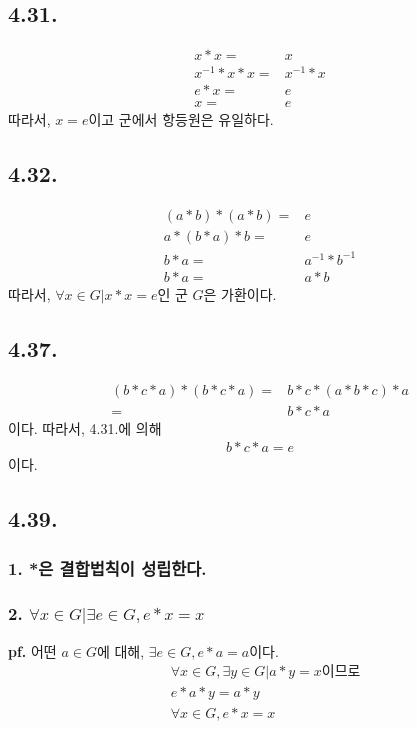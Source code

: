 \documentclass{article}
\begin{document}
\subsection{4.31.}
\begin{align*}
x * x =& x
\\ x^{-1} * x * x =& x^{-1} * x
\\ e * x =& e
\\ x =& e
\end{align*}
따라서, $x=e$이고 군에서 항등원은 유일하다.

\subsection{4.32.}
\begin{align*}
(a * b) * (a * b) =& e
\\ a * (b * a) * b =& e
\\ b * a =& a^{-1} *  b^{-1}
\\ b * a =& a * b
\end{align*}
따라서, $\forall x \in G | x * x = e$인 군 $G$은 가환이다.
\subsection{4.37.}
\begin{align*}
(b * c * a) * (b * c * a) =& b * c * (a * b * c) * a
\\ =& b * c * a
\end{align*}
이다. 따라서, 4.31.에 의해
\begin{align*}
b * c * a = e
\end{align*}
이다.
\subsection{4.39.}

\subsubsection{1. *은 결합법칙이 성립한다.}

\subsubsection{2. $\forall x \in G | \exists e \in G, e * x = x$}
\textbf{pf.}
어떤 $a \in G$에 대해, $\exists e \in G, e * a = a$이다.
\begin{align*}
&\forall x \in G, \exists y \in G | a * y = x \text{이므로}
\\& e * a * y = a * y
\\& \forall x \in G, e * x = x
\end{align*}
\end{document}
